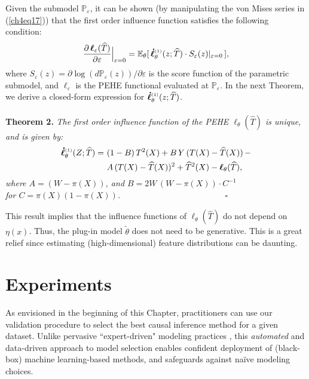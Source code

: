 \documentclass [PhD] {uclathes}
\begin{document}
Given the submodel \mbox{\footnotesize $\mathbb{P}_{\varepsilon}$}, it can be shown (by manipulating the von Mises series in (\ref{ch4eq17})) that the first order influence function satisfies the following condition: 
\begin{align}  
\frac{\partial\,\boldsymbol{\ell}_{\varepsilon}(\widehat{T})}{\partial \varepsilon}\Big|_{\varepsilon =0} = \mathbb{E}_{\theta}[\,\boldsymbol{\dot{\ell}}^{\mbox{\tiny $(1)$}}_{\theta}(z;\widehat{T})\cdot S_\varepsilon(z)|_{\varepsilon=0}\,],
\label{eq9}
\end{align} 
where \mbox{\footnotesize $S_\varepsilon(z) = \partial \log(d\mathbb{P}_{\varepsilon}(z))/\partial \varepsilon$} is the score function of the parametric submodel, and \mbox{\footnotesize $\boldsymbol{\ell}_{\varepsilon}$} is the PEHE functional evaluated at \mbox{\footnotesize $\mathbb{P}_{\varepsilon}$}. In the next Theorem, we derive a closed-form expression for \mbox{\footnotesize $\boldsymbol{\dot{\ell}}^{\mbox{\tiny $(1)$}}_{\theta}(z;\widehat{T})$}.\\ 
\\
{\bf Theorem 2.} {\it The first order influence function of the PEHE \mbox{\footnotesize $\boldsymbol{\ell}_{\theta}(\widehat{T})$} is unique, and is given by:} 
\begin{align}  
\boldsymbol{\dot{\ell}}^{\mbox{\tiny $(1)$}}_{\theta}(Z;\widehat{T}) =\,\, &(1-B)\,T^2(X) + B\,Y\,(T(X)-\widehat{T}(X)) \, - \nonumber \\
&A\,(T(X)-\widehat{T}(X))^2 + \widehat{T}^2(X) - \boldsymbol{\ell}_{\theta}(\widehat{T}), \nonumber
\end{align} 
{\it where $A = (W-\pi(X))$, and $B = 2W\,(W-\pi(X))\cdot C^{-1}$\,}\\ 
{\it for \mbox{\footnotesize $C = \pi(X)(1-\pi(X))$}.\,\,\,\,\,\,\,\,\,\,\,\,\,\,\,\,\,\,\,\,\,\,\,\,\,\,\,\,\,\,\,\,\,\,\,\,\,\,\,\,\,\,\,\,\,\,\,\,\,\,\,\,\,\,\,\,\,\,\,\,\,\,\,\,\,\,\,\,\,\,\,\,\, $\boldsymbol{\square}$}

This result implies that the influence functions of \mbox{\footnotesize $\boldsymbol{\ell}_{\theta}(\widehat{T})$} do not depend on \mbox{\footnotesize $\eta(x)$}. Thus, the plug-in model \mbox{\footnotesize $\tilde{\theta}$} does not need to be generative. This is a great relief since estimating (high-dimensional) feature distributions can be daunting.

\section{Experiments}
\label{Sec5} 
As envisioned in the beginning of this Chapter, practitioners can use our validation procedure to select the best causal inference method for a given dataset. Unlike pervasive ``expert-driven" modeling practices \cite{rubin2010limitations}, this {\it automated} and data-driven approach to model selection enables confident deployment of (black-box) machine learning-based methods, and safeguards against na\"ive modeling choices.
  
\end{document}

